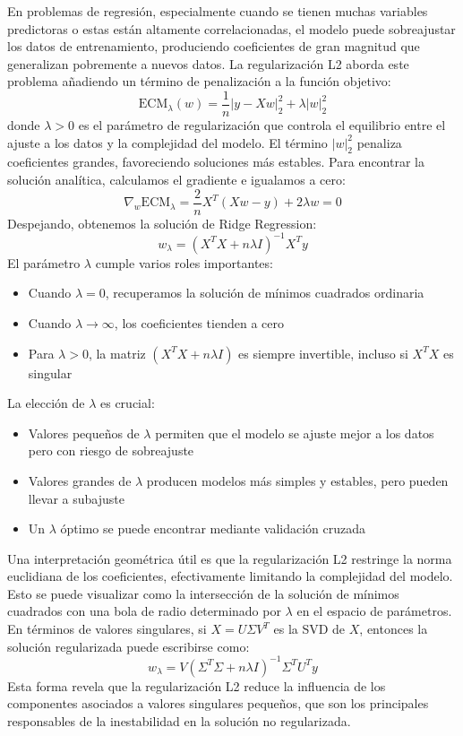 \documentclass{tp02}
\begin{document}
En problemas de regresión, especialmente cuando se tienen muchas variables predictoras o
estas están altamente correlacionadas, el modelo puede sobreajustar los datos de
entrenamiento, produciendo coeficientes de gran magnitud que generalizan pobremente a
nuevos datos. La regularización L2 aborda este problema añadiendo un término de
penalización a la función objetivo:
\begin{equation}
\text{ECM}_\lambda(w) = \frac{1}{n}|y - Xw|_2^2 + \lambda|w|_2^2
\end{equation}
donde $\lambda > 0$ es el parámetro de regularización que controla el equilibrio entre
el ajuste a los datos y la complejidad del modelo. El término $|w|_2^2$ penaliza
coeficientes grandes, favoreciendo soluciones más estables.
Para encontrar la solución analítica, calculamos el gradiente e igualamos a cero:
\begin{equation}
\nabla_w\text{ECM}_\lambda = \frac{2}{n}X^T(Xw - y) + 2\lambda w = 0
\label{eq:ridge}
\end{equation}
Despejando, obtenemos la solución de Ridge Regression:
\begin{equation}
w_\lambda = (X^TX + n\lambda I)^{-1}X^Ty
\end{equation}
El parámetro $\lambda$ cumple varios roles importantes:
\begin{itemize}
\item Cuando $\lambda = 0$, recuperamos la solución de mínimos cuadrados ordinaria
\item Cuando $\lambda \to \infty$, los coeficientes tienden a cero
\item Para $\lambda > 0$, la matriz $(X^TX + n\lambda I)$ es siempre invertible,
incluso si $X^TX$ es singular
\end{itemize}
La elección de $\lambda$ es crucial:
\begin{itemize}
\item Valores pequeños de $\lambda$ permiten que el modelo se ajuste mejor a los
datos pero con riesgo de sobreajuste
\item Valores grandes de $\lambda$ producen modelos más simples y estables, pero
pueden llevar a subajuste
\item Un $\lambda$ óptimo se puede encontrar mediante validación cruzada
\end{itemize}
Una interpretación geométrica útil es que la regularización L2 restringe la norma
euclidiana de los coeficientes, efectivamente limitando la complejidad del modelo.
Esto se puede visualizar como la intersección de la solución de mínimos cuadrados con
una bola de radio determinado por $\lambda$ en el espacio de parámetros.
En términos de valores singulares, si $X = U\Sigma V^T$ es la SVD de $X$, entonces la
solución regularizada puede escribirse como:
\begin{equation}
w_\lambda = V(\Sigma^T\Sigma + n\lambda I)^{-1}\Sigma^TU^Ty
\end{equation}
Esta forma revela que la regularización L2 reduce la influencia de los componentes
asociados a valores singulares pequeños, que son los principales responsables de la
inestabilidad en la solución no regularizada.
\end{document}
